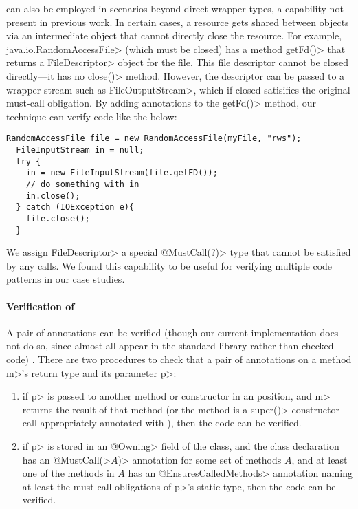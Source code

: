 \mccannot can also be employed in scenarios beyond direct wrapper types, a
capability not present in previous work.  In certain cases, a resource gets
shared between objects via an intermediate object that cannot directly close the
resource.  For example, \<java.io.RandomAccessFile> (which must be closed) has
a method \<getFd()> that returns a \<FileDescriptor>
object for the file. This file
descriptor cannot be closed directly---it has no \<close()> method.
However, the descriptor can be passed to a wrapper stream such as
\<FileOutputStream>, which if closed satisifies the original must-call
obligation.  By adding \mccannot annotations to the \<getFd()> method, our
technique can verify code like the below:
\begin{lstlisting}[frame=tb,belowskip=3mm]
  RandomAccessFile file = new RandomAccessFile(myFile, "rws");
  FileInputStream in = null;
  try {
    in = new FileInputStream(file.getFD());
    // do something with in  
    in.close();
  } catch (IOException e){
    file.close();
  }
\end{lstlisting}
We assign \<FileDescriptor> a special \<@MustCall(?)> type  that cannot be satisfied by any calls.  We found this capability to be
useful for verifying multiple code patterns in our case studies.

\paragraph{Verification of \mccannot}  A pair of \mccannot annotations can be verified (though our current
implementation does not do so, since almost all appear in the standard
library rather than checked code) . There are two
procedures to check
that a pair of \mccannot annotations on a method \<m>'s return type
and its parameter \<p>:
\begin{enumerate}
\item if \<p> is passed to another method or constructor in an
  \mccannot position, and \<m> returns the result of that method
  (or the method is a \<super()> constructor call appropriately annotated
  with \mccannot), then the code can be verified.
\item if \<p> is stored in an \<@Owning> field of the class, and the
  class declaration has an \<@MustCall(>$A$\<)> annotation for some set
  of methods $A$, and at least one of the methods in $A$ has an
  \<@EnsuresCalledMethods> annotation naming at least the
  must-call obligations of \<p>'s static type, then the code can be verified.
\end{enumerate}

